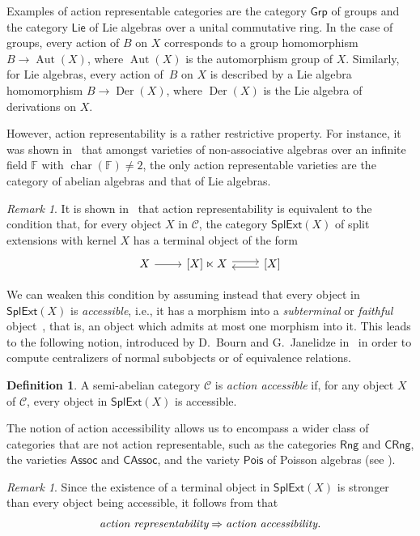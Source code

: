 \documentclass[reqno,a4paper]{amsart}
\theoremstyle{plain}
\theoremstyle{definition}
\newtheorem{definition}[subsection]{Definition}
\theoremstyle{remark}
\newtheorem{remark}[subsection]{Remark}
\numberwithin{equation}{section}
\newcommand{\C}{\ensuremath{\mathcal{C}}}
\newcommand{\F}{\mathbb{F}}
\DeclareMathOperator{\bchar}{char}
\DeclareMathOperator{\Aut}{Aut}
\DeclareMathOperator{\Der}{Der}
\newcommand{\Rng}{\ensuremath{\mathsf{Rng}}}
\newcommand{\Assoc}{\ensuremath{\mathsf{Assoc}}}
\newcommand{\Lie}{\ensuremath{\mathsf{Lie}}}
\newcommand{\Pois}{\ensuremath{\mathsf{Pois}}}
\newcommand{\CAssoc}{\ensuremath{\mathsf{CAssoc}}}
\newcommand{\Grp}{\ensuremath{\mathsf{Grp}}}
\newcommand{\CRng}{\ensuremath{\mathsf{CRng}}}
\newcommand{\SplExtX}{\ensuremath{\mathsf{SplExt}(X)}}
\begin{document}
Examples of action representable categories are the category $\Grp$ of groups and the category $\Lie$ of Lie algebras over a unital commutative ring. In the case of groups, every action of $B$ on $X$ corresponds to a group homomorphism $B \to \Aut(X)$, where $\Aut(X)$ is the automorphism group of $X$. Similarly, for Lie algebras, every action of~$B$ on $X$ is described by a Lie algebra homomorphism $B \to  \Der(X)$, where $\Der(X)$ is the Lie algebra of derivations on $X$.

However, action representability is a rather restrictive property. For instance, it was shown in~\cite[Theorem 6.1]{Tim} that amongst varieties of non-associative algebras over an infinite field $\F$ with $\bchar(\F) \neq 2$, the only action representable varieties are the category of abelian algebras and that of Lie algebras.

\begin{remark}\label{BJ}
It is shown in~\cite{BJK} that action representability is equivalent to the condition that, for every object $X$ in $\C$, the category $\SplExtX$ of split extensions with kernel $X$ has a terminal object of the form
\[
\begin{tikzcd}
X \arrow[r]
& {[X] \ltimes X} \arrow[r, shift left] &
{[X]} \arrow[l, shift left]
\end{tikzcd}
\]
\end{remark}

We can weaken this condition by assuming instead that every object in $\SplExtX$ is \emph{accessible}, i.e., it has a morphism into a \emph{subterminal} or \emph{faithful} object~\cite{act_accessible}, that is, an object which admits at most one morphism into it. This leads to the following notion, introduced by D.~Bourn and G.~Janelidze in~\cite{act_accessible} in order to compute centralizers of normal subobjects or of equivalence relations.

\begin{definition}\cite{act_accessible}
A semi-abelian category $\C$ is \emph{action accessible} if, for any object $X$ of $\C$, every object in $\SplExtX$ is accessible.
\end{definition}

The notion of action accessibility allows us to encompass a wider class of categories that are not action representable, such as the categories $\Rng$ and $\CRng$, the varieties $\Assoc$ and $\CAssoc$, and the variety $\Pois$ of Poisson algebras (see ).

\begin{remark}
Since the existence of a terminal object in $\SplExtX$ is stronger than every object being accessible, it follows from  that
\[
\emph{action representability}\Rightarrow\emph{action accessibility.}
\]
\end{remark}
\end{document}
